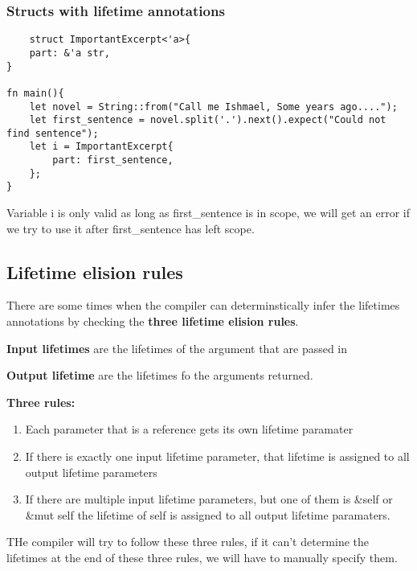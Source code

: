 \subsubsection{Structs with lifetime annotations}


\begin{lstlisting}
    struct ImportantExcerpt<'a>{
    part: &'a str,
}

fn main(){
    let novel = String::from("Call me Ishmael, Some years ago....");
    let first_sentence = novel.split('.').next().expect("Could not find sentence");
    let i = ImportantExcerpt{
        part: first_sentence,
    };
}
\end{lstlisting}

Variable i is only valid as long as first\_sentence is in scope, we will get an error if we try to use it after first\_sentence has left scope.

\subsection{Lifetime elision rules}

There are some times when the compiler can determinstically infer the lifetimes annotations by checking the \textbf{three lifetime elision rules}.  

\begin{definition}
    \textbf{Input lifetimes} are the lifetimes of the argument that are passed in
\end{definition}

\begin{definition}
    \textbf{Output lifetime} are the lifetimes fo the arguments returned.
\end{definition}

\begin{definition}
    \textbf{Three rules:}

    \begin{enumerate}
        \item Each parameter that is a reference gets its own lifetime paramater
        \item If there is exactly one input lifetime parameter, that lifetime is assigned to all output lifetime parameters
        \item If there are multiple input lifetime parameters, but one of them is \&self or \&mut self the lifetime of self is assigned to all output lifetime paramaters.
    \end{enumerate}
\end{definition}
THe compiler will try to follow these three rules, if it can't determine the lifetimes at the end of these three rules, we will have to manually specify them.

